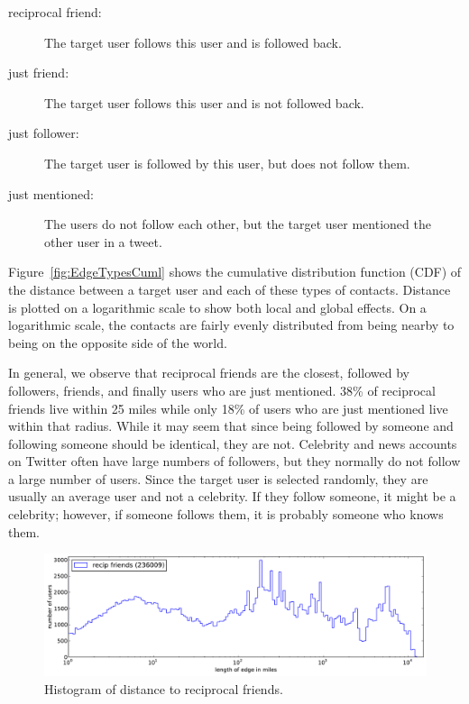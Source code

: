 \documentclass[letterpaper]{article}
\begin{document}
\begin{description}
\item[reciprocal friend:] The target user follows this user and is followed
    back.
\item[just friend:] The target user follows this user and is not followed
    back.
\item[just follower:] The target user is followed by this user, but does
    not follow them.
\item[just mentioned:] The users do not follow each other, but the target
    user mentioned the other user in a tweet.
\end{description}

Figure~\ref{fig:EdgeTypesCuml} shows the cumulative distribution
function (CDF) of the distance between a target user and each of these types of
contacts.
%
Distance is plotted on a logarithmic scale to show both local and
global effects.
%
On a logarithmic scale, the contacts are fairly evenly distributed from being
nearby to being on the opposite side of the world.
%
%
%

In general, we observe that reciprocal friends are the closest, followed by followers, friends,
and finally users who are just mentioned.
%
38\% of reciprocal friends live within 25 miles while only 18\% of users
who are just mentioned live within that radius.
%
While it may seem that since being followed by someone and following someone
should be identical, they are not.
%
Celebrity and news accounts on Twitter often have large numbers of followers,
but they normally do not follow a large number of users.
%
Since the target user is selected randomly, they are usually an average
user and not a celebrity.
%
If they follow someone, it might be a celebrity; however, if someone follows
them, it is probably someone who knows them.

\begin{figure}[tb]
\centering
\includegraphics[width=.9\linewidth]{figures/rfrd_norm.pdf}
\caption{
Histogram of distance to reciprocal friends.
}
\label{fig:EdgeTypes}
\vspace{-2pt}
\end{figure}
\end{document}
